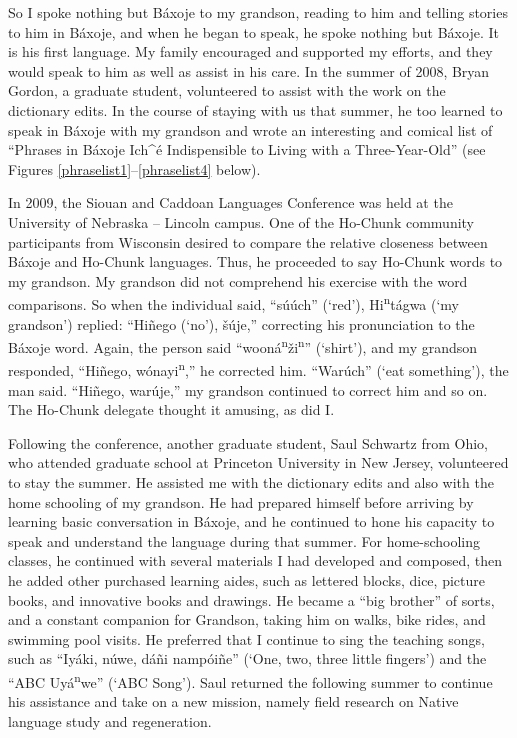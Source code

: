 \documentclass[output=paper]{LSP/langsci}
\begin{document}
So I spoke nothing but B\'axoje to my grandson, reading to him and telling stories to him in B\'axoje, and when he began to speak, he spoke nothing but B\'axoje. It is his first language. My family encouraged and supported my efforts, and they would speak to him as well as assist in his care. In the summer of 2008, Bryan Gordon, a graduate student, volunteered to assist with the work on the dictionary edits. In the course of staying with us that summer, he too learned to speak in B\'axoje with my grandson and wrote an interesting and comical list of ``Phrases in B\'axoje Ich\^{ }\'e Indispensible to Living with a Three-Year-Old'' (see Figures \ref{phraselist1}--\ref{phraselist4} below).

In 2009, the Siouan and Caddoan Languages Conference was held at the University of Nebraska -- Lincoln campus. One of the Ho-Chunk community participants from Wisconsin desired to compare the relative closeness between B\'axoje and Ho-Chunk languages. Thus, he proceeded to say Ho-Chunk words to my grandson. My grandson did not comprehend his exercise with the word comparisons. So when the individual said, ``s\'u\'uch'' (`red'), Hi\textsuperscript{n}t\'agwa (`my grandson') replied: ``Hi\~nego (`no'), \v{s}\'uje,'' correcting his pronunciation to the B\'axoje word. Again, the person said ``woon\'a\textsuperscript{n}\v{z}i\textsuperscript{n}'' (`shirt'), and my grandson responded, ``Hi\~nego, w\'onayi\textsuperscript{n},'' he corrected him. ``War\'uch'' (`eat something'), the man said. ``Hi\~nego, war\'uje,'' my grandson continued to correct him and so on. The Ho-Chunk delegate thought it amusing, as did I.

Following the conference, another graduate student, Saul Schwartz from Ohio, who attended graduate school at Princeton University in New Jersey, volunteered to stay the summer. He assisted me with the dictionary edits and also with the home schooling of my grandson. He had prepared himself before arriving by learning basic conversation in B\'axoje, and he continued to hone his capacity to speak and understand the language during that summer. For home-schooling classes, he continued with several materials I had developed and composed, then he added other purchased learning aides, such as lettered blocks, dice, picture books, and innovative books and drawings. He became a ``big brother'' of sorts, and a constant companion for Grandson, taking him on walks, bike rides, and swimming pool visits. He preferred that I continue to sing the teaching songs, such as ``Iy\'aki, n\'uwe, d\'a\~ni namp\'oi\~ne'' (`One, two, three little fingers') and the ``ABC Uy\'a\textsuperscript{n}we'' (`ABC Song'). Saul returned the following summer to continue his assistance and take on a new mission, namely field research on Native language study and regeneration.  
\end{document}
